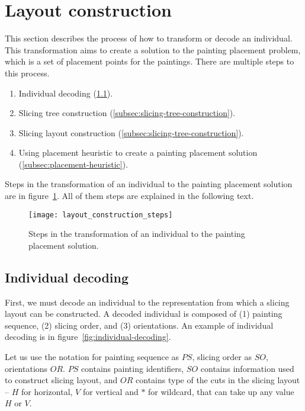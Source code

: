\newpage


\section{Layout construction}\label{sec:layout-construction}

This section describes the process of how to transform or decode an individual.
This transformation aims to create a solution to the painting placement problem,
which is a set of placement points for the paintings.
There are multiple steps to this process.

\begin{enumerate}
    \item Individual decoding (\ref{subsec:individual-decoding}).
    \item Slicing tree construction (\ref{subsec:slicing-tree-construction}).
    \item Slicing layout construction (\ref{subsec:slicing-tree-construction}).
    \item Using placement heuristic to create a painting placement solution (\ref{subsec:placement-heuristic}).
\end{enumerate}

Steps in the transformation of an individual to the painting placement solution are
in figure~\ref{fig:layout-construction-steps}.
All of them steps are explained in the following text.

\begin{figure}[h!]
    \texttt{[image: layout\_construction\_steps]}
    \caption{Steps in the transformation of an individual to the painting placement solution.}
    \label{fig:layout-construction-steps}
\end{figure}

\subsection{Individual decoding}\label{subsec:individual-decoding}
First, we must decode an individual to the representation from which a slicing layout can be constructed.
A decoded individual is composed of (1) painting sequence, (2) slicing order, and (3) orientations.
An example of individual decoding is in figure~\ref{fig:individual-decoding}.

Let us use the notation for painting sequence as $PS$, slicing order as $SO$, orientations $OR$.
$PS$ contains painting identifiers, $SO$ contains information used to construct slicing layout,
and $OR$ contains type of the cuts in the slicing layout – $H$ for horizontal, $V$ for vertical
and $*$ for wildcard, that can take up any value $H$ or $V$.

